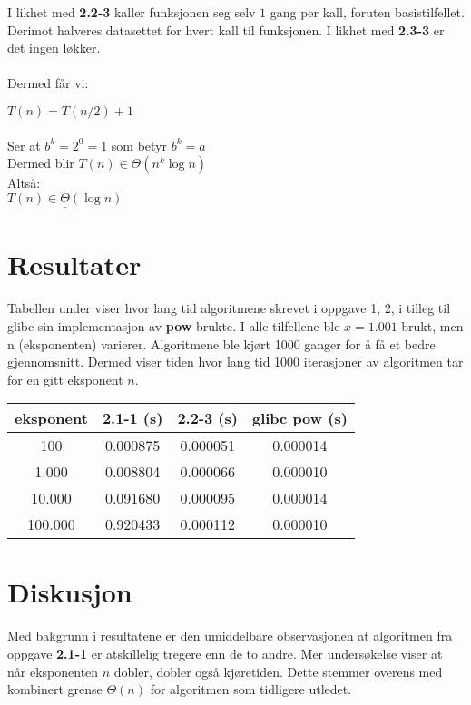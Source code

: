\documentclass{article}
\def\dunderline#1{\underline{\underline{#1}}}
\begin{document}
I likhet med \textbf{2.2-3} kaller funksjonen seg selv \(1\) gang per kall, foruten basistilfellet. Derimot halveres datasettet for hvert kall til funksjonen. I likhet med \textbf{2.3-3} er det ingen løkker.\\\\
Dermed får vi:

$ T(n) = T(n / 2) + 1 $\\\\
Ser at \(b^k = 2^0 = 1\) som betyr \(b^k = a\)\\

Dermed blir \(T(n) \in \Theta(n^k{\log n})\)\\

Altså:\\

$ \dunderline{T(n) \in \Theta({\log n})} $


\section{Resultater}

Tabellen under viser hvor lang tid algoritmene skrevet i oppgave 1, 2, i tilleg til glibc sin implementasjon av \textbf{pow} brukte. I alle tilfellene ble \(x=1.001\) brukt, men n (eksponenten) varierer. Algoritmene ble kjørt 1000 ganger for å få et bedre gjennomsnitt. Dermed viser tiden hvor lang tid 1000 iterasjoner av algoritmen tar for en gitt eksponent \(n\).

\begin{center}
\begin{tabular}{|c c c c|} 
 \hline
 eksponent & 2.1-1 (s) & 2.2-3 (s) & glibc pow (s) \\ [0.5ex] 
 \hline\hline
 100 & 0.000875 & 0.000051 & 0.000014 \\ 
 \hline
 1.000 & 0.008804 & 0.000066 & 0.000010 \\
 \hline
 10.000 & 0.091680 & 0.000095 & 0.000014 \\
 \hline
 100.000 & 0.920433 & 0.000112 & 0.000010 \\
 
 \hline
\end{tabular}
\end{center}

\section{Diskusjon}

Med bakgrunn i resultatene er den umiddelbare observasjonen at algoritmen fra oppgave \textbf{2.1-1} er atskillelig tregere enn de to andre. Mer undersøkelse viser at når eksponenten \(n\) dobler, dobler også kjøretiden. Dette stemmer overens med kombinert grense \(\Theta(n)\) for algoritmen som tidligere utledet.\\
\end{document}
